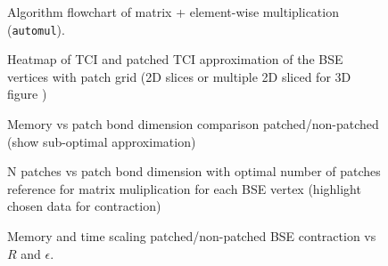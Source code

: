 \begin{figure}[ht!]
    \caption{Algorithm flowchart of matrix + element-wise multiplication\\(\texttt{automul}).}
\end{figure}

\begin{figure}[ht!]
    \caption{Heatmap of TCI and patched TCI approximation of the BSE vertices with patch grid (2D slices or multiple 2D sliced for 3D figure )}
\end{figure}

\begin{figure}[ht!]
    \caption{Memory vs patch bond dimension comparison patched/non-patched (show sub-optimal approximation)}
\end{figure}

\begin{figure}[ht!]
    \caption{N patches vs patch bond dimension with optimal number of patches reference for matrix muliplication for each BSE vertex (highlight chosen data for contraction)}
\end{figure}

\begin{figure}[ht!]
    \caption{Memory and time scaling patched/non-patched BSE contraction vs $R$ and $\epsilon$.}
\end{figure}










